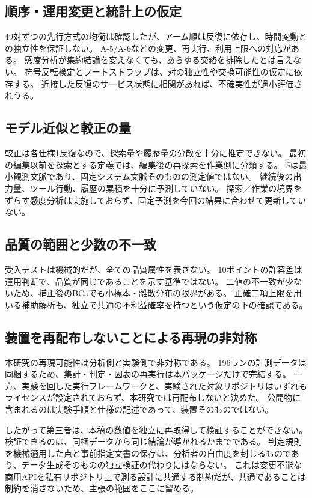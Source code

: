 \documentclass[a4paper,11pt]{article}
\begin{document}
\subsection{順序・運用変更と統計上の仮定}
49対ずつの先行方式の均衡は確認したが、アーム順は反復に依存し、時間変動との独立性を保証しない。
A-5/A-6などの変更、再実行、利用上限への対応がある。
感度分析が集約結論を変えなくても、あらゆる交絡を排除したとは言えない。
符号反転検定とブートストラップは、対の独立性や交換可能性の仮定に依存する。
近接した反復のサービス状態に相関があれば、不確実性が過小評価されうる。

\subsection{モデル近似と較正の量}
較正は各仕様1反復なので、探索量や履歴量の分散を十分に推定できない。
最初の編集以前を探索とする定義では、編集後の再探索を作業側に分類する。
$\widehat S$は最小観測文脈であり、固定システム文脈そのものの測定値ではない。
継続後の出力量、ツール行動、履歴の累積を十分に予測していない。
探索／作業の境界をずらす感度分析は実施しておらず、固定予測を今回の結果に合わせて更新していない。

\subsection{品質の範囲と少数の不一致}
受入テストは機械的だが、全ての品質属性を表さない。
10ポイントの許容差は運用判断で、品質が同じであることを示す基準ではない。
二値の不一致が少ないため、補正後のBCaでも小標本・離散分布の限界がある。
正確二項上限を用いる補助解析も、独立で共通の不利益確率を持つという仮定の下の確認である。

\subsection{装置を再配布しないことによる再現の非対称}
本研究の再現可能性は分析側と実験側で非対称である。
196ランの計測データは同梱するため、集計・判定・図表の再実行は本パッケージだけで完結する。
一方、実験を回した実行フレームワークと、実験された対象リポジトリはいずれもライセンスが設定されておらず、本研究では再配布しないと決めた。
公開物に含まれるのは実験手順と仕様の記述であって、装置そのものではない。

したがって第三者は、本稿の数値を独立に再取得して検証することができない。
検証できるのは、同梱データから同じ結論が導かれるかまでである。
判定規則を機械適用した点と事前指定文書の保存は、分析者の自由度を封じるものであり、データ生成そのものの独立検証の代わりにはならない。
これは変更不能な商用APIを私有リポジトリ上で測る設計に共通する制約だが、共通であることは制約を消さないため、主張の範囲をここに留める。
\end{document}
